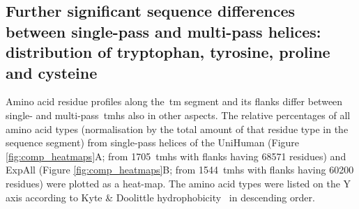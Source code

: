 \subsection{Further significant sequence differences between single\--pass and multi\--pass helices: distribution of tryptophan, tyrosine, proline and cysteine}

Amino acid residue profiles along the~\gls{tm} segment and its flanks differ between single- and multi\--pass~\gls{tmh}s also in other aspects.
The relative percentages of all amino acid types (normalisation by the total amount of that residue type in the sequence segment) from single\--pass helices of the UniHuman (Figure \ref{fig:comp_heatmaps}A; from 1705~\gls{tmh}s with flanks having 68571 residues) and ExpAll (Figure \ref{fig:comp_heatmaps}B; from 1544~\gls{tmh}s with flanks having 60200 residues) were plotted as a heat-map.
The amino acid types were listed on the Y axis according to Kyte \& Doolittle hydrophobicity~\cite{Kyte1982} in descending order.

